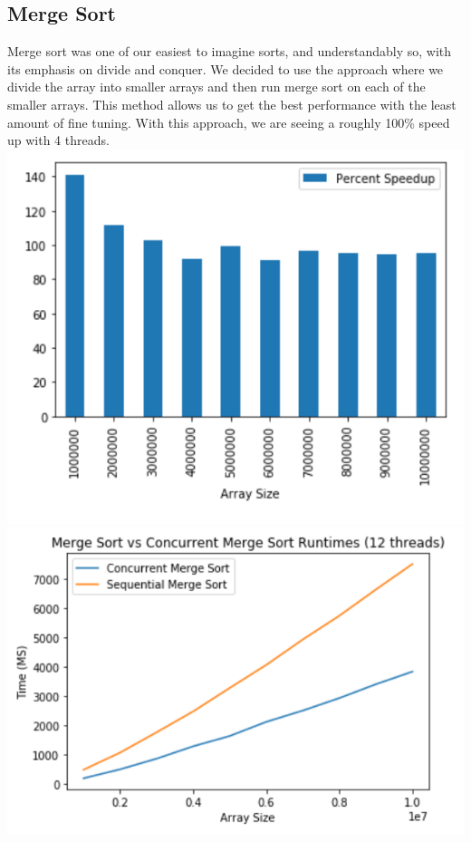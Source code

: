\documentclass{article}
\begin{document}
\subsection{Merge Sort}
Merge sort was one of our easiest to imagine sorts, and understandably so, with its emphasis on divide and conquer. We decided to use the approach where we divide the array into smaller arrays and then run merge sort on each of the smaller arrays. This method allows us to get the best performance with the least amount of fine tuning. With this approach, we are seeing a roughly 100\% speed up with 4 threads.\newline
\includegraphics{figures/mergebar.PNG}\newline
\includegraphics{figures/merge_line.PNG}
\end{document}
